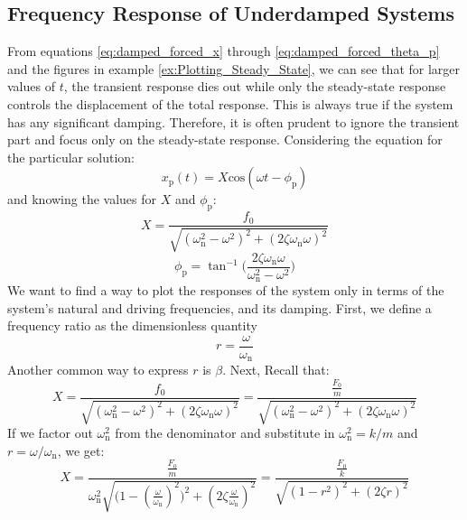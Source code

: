 \documentclass[12pt,letter]{article}
\begin{document}
\subsection{Frequency Response of Underdamped Systems}      
 From equations \ref{eq:damped_forced_x} through \ref{eq:damped_forced_theta_p} and the figures in example \ref{ex:Plotting_Steady_State}, we can see that for larger values of $t$, the transient response dies out while only the steady-state response controls the displacement of the total response. This is always true if the system has any significant damping. Therefore, it is often prudent to ignore the transient part and focus only on the steady-state response. Considering the equation for the particular solution: 
 \begin{equation}
  x_\text{p}(t) = X \text{cos}(\omega t - \phi_\text{p})
 \end{equation}    
 and knowing the values for $X$ and $\phi_\text{p}$: 
 \begin{equation}
  X = \frac{f_0}{\sqrt{(\omega_\text{n}^2 - \omega^2)^2 +  (2\zeta \omega_\text{n} \omega)^2}} 
 \end{equation} 
 \begin{equation}
  \phi_\text{p} = \tan^{-1} \bigg(\frac{2\zeta \omega_\text{n} \omega}{\omega_\text{n}^2 - \omega^2}\bigg)
 \end{equation} 
 We want to find a way to plot the responses of the system only in terms of the system's natural and driving frequencies, and its damping. First, we define a frequency ratio as the dimensionless quantity 
 \begin{equation}
  r = \frac{\omega}{\omega_\text{n}}
 \end{equation}
 Another common way to express $r$ is $\beta$. Next, Recall that:
 \begin{equation}
  X = \frac{f_0}{\sqrt{(\omega_\text{n}^2 - \omega^2)^2 +  (2\zeta \omega_\text{n} \omega)^2}}  = \frac{\frac{F_0}{m}}{\sqrt{(\omega_\text{n}^2 - \omega^2)^2 +  (2\zeta \omega_\text{n} \omega)^2}} 
 \end{equation}    
 If we factor out $\omega_\text{n}^2$ from the denominator and substitute in $\omega_\text{n}^2 = k/m$ and $r = \omega/\omega_\text{n}$, we get:
 \begin{equation}
  X = \frac{\frac{F_0}{m}}{\omega_\text{n}^2 \sqrt{\big(1 - (\frac{\omega}{\omega_\text{n}})^2\big)^2 +  (2\zeta \frac{\omega}{\omega_\text{n}})^2}} =  \frac{\frac{F_0}{k}}{\sqrt{(1-r^2)^2+(2\zeta r)^2}}
 \end{equation}    
\end{document}
